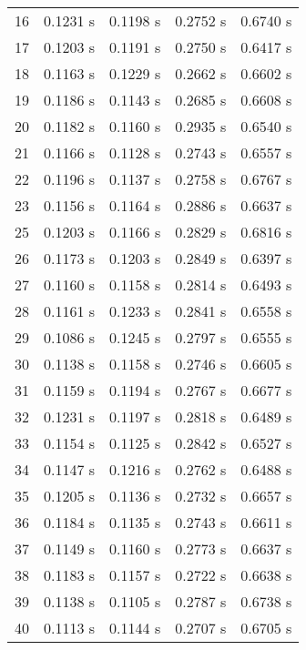 \begin{table}[]
\begin{tabular}{cllll}
    16 &0.1231 s & 0.1198 s & 0.2752 s & 0.6740 s \\
    17 &0.1203 s & 0.1191 s & 0.2750 s & 0.6417 s \\
    18 &0.1163 s & 0.1229 s & 0.2662 s & 0.6602 s \\
    19 &0.1186 s & 0.1143 s & 0.2685 s & 0.6608 s    \\
    20 &0.1182 s & 0.1160 s & 0.2935 s & 0.6540 s \\
    21 & 0.1166 s & 0.1128 s  & 0.2743 s & 0.6557 s \\
    22 & 0.1196 s  & 0.1137 s & 0.2758 s & 0.6767 s \\
    23 & 0.1156 s & 0.1164 s & 0.2886 s & 0.6637 s \\
    25 & 0.1203 s & 0.1166 s & 0.2829 s & 0.6816 s \\
    26 & 0.1173 s & 0.1203 s & 0.2849 s & 0.6397 s \\
    27 & 0.1160 s  & 0.1158 s & 0.2814 s & 0.6493 s \\
    28 & 0.1161 s & 0.1233 s & 0.2841 s & 0.6558 s \\
    29 & 0.1086 s & 0.1245 s & 0.2797 s & 0.6555 s \\
    30 &0.1138 s & 0.1158 s & 0.2746 s & 0.6605 s \\
    31 &0.1159 s & 0.1194 s   & 0.2767 s & 0.6677 s \\
    32 &0.1231 s  & 0.1197 s & 0.2818 s & 0.6489 s \\
    33 &0.1154 s & 0.1125 s & 0.2842 s & 0.6527 s  \\
    34 &0.1147 s  & 0.1216 s & 0.2762 s & 0.6488 s \\
    35 &0.1205 s & 0.1136 s & 0.2732 s & 0.6657 s \\
    36 &0.1184 s & 0.1135 s & 0.2743 s & 0.6611 s \\
    37 &0.1149 s  & 0.1160 s & 0.2773 s & 0.6637 s \\
    38 &0.1183 s & 0.1157 s & 0.2722 s & 0.6638 s \\
    39 &0.1138 s & 0.1105 s & 0.2787 s & 0.6738 s  \\
    40 &0.1113 s & 0.1144 s & 0.2707 s & 0.6705 s
  \end{tabular}
\end{table}

